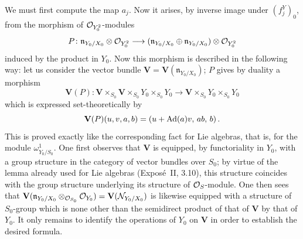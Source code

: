 We must first compute the map \(a_{j}\). Now it arises, by inverse image
under \((f_{j}^{Y})_{0}\), from the morphism of \(\mathcal{O}_{Y_{0}^{2}}\)-modules
\[
P\colon
\mathfrak{n}_{Y_{0}/X_{0}}\otimes\mathcal{O}_{Y_{0}^{2}}
\longrightarrow
(\mathfrak{n}_{Y_{0}/X_{0}}\oplus\mathfrak{n}_{Y_{0}/X_{0}})\otimes\mathcal{O}_{Y_{0}^{2}}
\]
induced by the product in \(Y_{0}\). Now this morphism is described in the
following way: let us consider the vector bundle
\(\mathbf{V}=\mathbf{V}(\mathfrak{n}_{Y_{0}/X_{0}})\); \(P\) gives by duality a
morphism
\[
\mathbf{V}(P)\colon
\mathbf{V}\times_{S_{0}}\mathbf{V}\times_{S_{0}}Y_{0}\times_{S_{0}}Y_{0}
\longrightarrow
\mathbf{V}\times_{S_{0}}Y_{0}\times_{S_{0}}Y_{0}
\]
which is expressed set-theoretically by
\[
\mathbf{V}(P)(u,v,a,b)=(u+\operatorname{Ad}(a)v,\,ab,\,b)\,.
\]
{\renewcommand{\thefootnote}{(112)}}
This is proved exactly like the corresponding fact for Lie algebras, that is,
for the module \(\omega^{1}_{Y_{0}/S_{0}}\). One first observes that
\(\mathbf{V}\) is equipped, by functoriality in \(Y_{0}\), with a group
structure in the category of vector bundles over \(S_{0}\); by virtue of the
lemma already used for Lie algebras (Expos\'e~II, 3.10), this structure
coincides with the group structure underlying its structure of
\(\mathcal{O}_{S}\)-module.
One then sees that
\(\mathbf{V}(\mathfrak{n}_{Y_{0}/X_{0}}\otimes_{\mathcal{O}_{S_{0}}}\mathcal{O}_{Y_{0}})
=\mathbf{V}(\mathcal{N}_{Y_{0}/X_{0}})\)
is likewise equipped with a structure of \(S_{0}\)-group which is none other
than the semidirect product of that of \(\mathbf{V}\) by that of \(Y_{0}\).
It only remains to identify the operations of \(Y_{0}\) on \(\mathbf{V}\) in
order to establish the desired formula.

